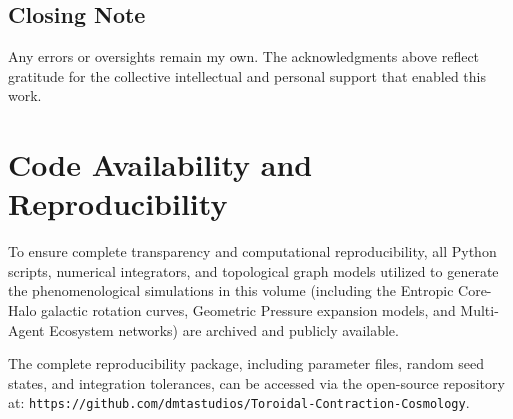 \documentclass[12pt,openany]{book}
\theoremstyle{plain}
\theoremstyle{definition}
\theoremstyle{remark}
\begin{document}
\section{Closing Note}
Any errors or oversights remain my own. The acknowledgments above reflect 
gratitude for the collective intellectual and personal support that enabled 
this work.

\chapter{Code Availability and Reproducibility}

To ensure complete transparency and computational reproducibility, all Python scripts, numerical integrators, and topological graph models utilized to generate the phenomenological simulations in this volume (including the Entropic Core-Halo galactic rotation curves, Geometric Pressure expansion models, and Multi-Agent Ecosystem networks) are archived and publicly available. 

The complete reproducibility package, including parameter files, random seed states, and integration tolerances, can be accessed via the open-source repository at: \texttt{https://github.com/dmtastudios/Toroidal-Contraction-Cosmology}.
\end{document}
